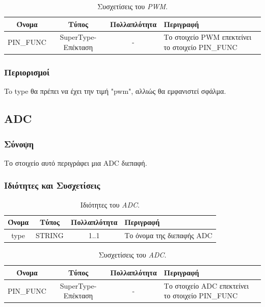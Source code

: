 \begin{table}[H]
	\begin{center}
		\caption{Συσχετίσεις του \textit{PWM}.}
		\label{tab:pwm2}
		\begin{tabular}{ | c | c | c| m{5.5cm} | }
			\hline
			\rowcolor{Gray}
			Όνομα & Τύπος & Πολλαπλότητα & Περιγραφή \\
			\hline
			PIN\_FUNC & SuperType-Επέκταση & - &  Το στοιχείο PWM επεκτείνει το στοιχείο PIN\_FUNC \\
			\hline
		\end{tabular}
	\end{center}
\end{table}

\subsubsection*{Περιορισμοί}

\noindent To type θα πρέπει να έχει την τιμή "pwm", αλλιώς θα εμφανιστεί σφάλμα.

\subsection{ADC}
\label{subsec:adc}

\subsubsection*{Σύνοψη}

\noindent Το στοιχείο αυτό περιγράφει μια ADC διεπαφή.

\subsubsection*{Ιδιότητες και Συσχετίσεις}

\begin{table}[H]
	\begin{center}
		\caption{Ιδιότητες του \textit{ADC}.}
		\label{tab:adc1}
		\begin{tabular}{ | c | c | c| m{5.5cm} | }
			\hline
			\rowcolor{Gray}
			Όνομα & Τύπος & Πολλαπλότητα & Περιγραφή \\
			\hline
			type & STRING & 1..1 & Το όνομα της διεπαφής ADC \\
			\hline
		\end{tabular}
	\end{center}
\end{table}

\begin{table}[H]
	\begin{center}
		\caption{Συσχετίσεις του \textit{ADC}.}
		\label{tab:adc2}
		\begin{tabular}{ | c | c | c| m{5.5cm} | }
			\hline
			\rowcolor{Gray}
			Όνομα & Τύπος & Πολλαπλότητα & Περιγραφή \\
			\hline
			PIN\_FUNC & SuperType-Επέκταση & - &  Το στοιχείο ADC επεκτείνει το στοιχείο PIN\_FUNC \\
			\hline
		\end{tabular}
	\end{center}
\end{table}

